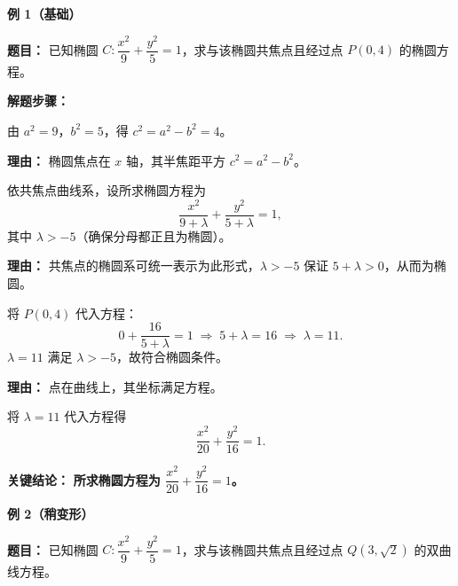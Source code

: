 \begin{examplebox}

	\textbf{\textcolor{CExample}{例 1（基础）}}

	\textbf{\textcolor{CExample}{题目：}}
	已知椭圆 $C:\dfrac{x^2}{9}+\dfrac{y^2}{5}=1$，求与该椭圆共焦点且经过点 $P(0,4)$ 的椭圆方程。

	\textbf{\textcolor{CExample}{解题步骤：}}
	\begin{description}[style=nextline, leftmargin=2.8em, labelsep=0.5em, itemsep=0.45em]
		\item[\textbf{第一步（计算焦距）：}] 由 $a^2=9$，$b^2=5$，得 $c^2=a^2-b^2=4$。
			\par\textbf{理由：} 椭圆焦点在 $x$ 轴，其半焦距平方 $c^2=a^2-b^2$。
		\item[\textbf{第二步（设曲线系方程）：}] 依共焦点曲线系，设所求椭圆方程为
			\[
				\frac{x^2}{9+\lambda}+\frac{y^2}{5+\lambda}=1,
			\]
			其中 $\lambda>-5$（确保分母都正且为椭圆）。
			\par\textbf{理由：} 共焦点的椭圆系可统一表示为此形式，$\lambda>-5$ 保证 $5+\lambda>0$，从而为椭圆。
		\item[\textbf{第三步（代入点求 $\lambda$）：}] 将 $P(0,4)$ 代入方程：
			\[
				0+\frac{16}{5+\lambda}=1\;\Longrightarrow\;5+\lambda=16\;\Longrightarrow\;\lambda=11.
			\]
			$\lambda=11$ 满足 $\lambda>-5$，故符合椭圆条件。
			\par\textbf{理由：} 点在曲线上，其坐标满足方程。
		\item[\textbf{第四步（写出方程）：}] 将 $\lambda=11$ 代入方程得
			\[
				\frac{x^2}{20}+\frac{y^2}{16}=1.
			\]
	\end{description}

	\textbf{\textcolor{CExample}{关键结论：}}
	\textbf{所求椭圆方程为 $\dfrac{x^2}{20}+\dfrac{y^2}{16}=1$。}

	\medskip
	\textbf{\textcolor{CExample}{例 2（稍变形）}}

	\textbf{\textcolor{CExample}{题目：}}
	已知椭圆 $C:\dfrac{x^2}{9}+\dfrac{y^2}{5}=1$，求与该椭圆共焦点且经过点 $Q(3,\sqrt{2})$ 的双曲线方程。


\end{examplebox}
